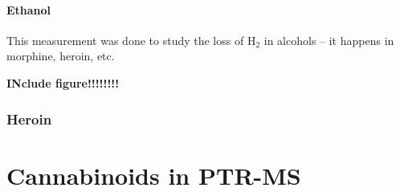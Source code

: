 \paragraph{Ethanol}

This measurement was done to study the loss of H$_2$ in alcohols -- it happens in morphine, heroin, etc.

\textbf{INclude figure!!!!!!!!}


\subsubsection{Heroin}



\section{Cannabinoids in PTR-MS}




